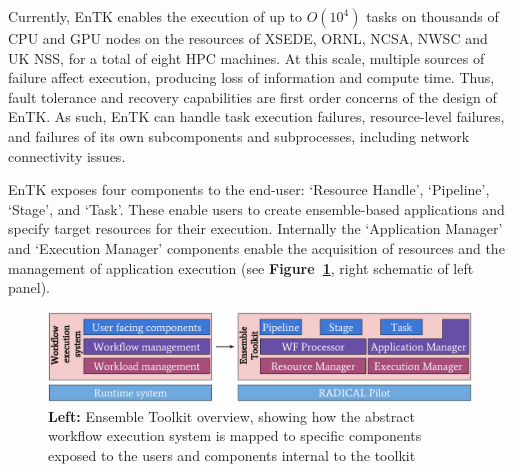Currently, EnTK enables the execution of up to \(O(10^4)\) tasks on thousands
of CPU and GPU nodes on the resources of XSEDE, ORNL, NCSA, NWSC and UK NSS,
for a total of eight HPC machines. At this scale, multiple sources of failure
affect execution, producing loss of information and compute time. Thus, fault
tolerance and recovery capabilities are first order concerns of the design of
EnTK\@. As such, EnTK can handle task execution failures, resource-level
failures, and failures of its own subcomponents and subprocesses, including
network connectivity issues.

EnTK exposes four components to the end-user: `Resource Handle', `Pipeline',
`Stage', and `Task'. These enable users to create ensemble-based applications
and specify target resources for their execution. Internally the `Application
Manager' and `Execution Manager' components enable the acquisition of
resources and the management of application execution (see
\textbf{Figure~\ref{fig:entk_arch}}, right schematic of left panel).

\begin{figure}[!htbp]
  \begin{minipage}[b]{0.49\textwidth}
  \centering
  \includegraphics[width=\textwidth]{FIGURES/entk_overview.pdf}
  \end{minipage}
  \caption{\textbf{Left:} Ensemble Toolkit overview, showing how the abstract
           workflow execution system is mapped to specific components exposed
           to the users and components internal to the toolkit
           }\label{fig:entk_arch}
\end{figure}

